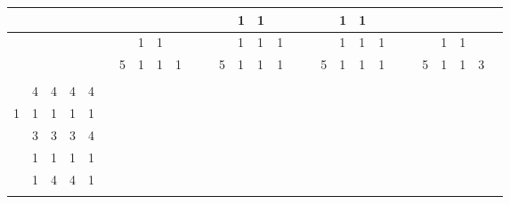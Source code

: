 \documentclass{article}
\begin{document}
\begin{center}

\begin{tabular}
{|p{5pt}|p{5pt}|p{5pt}|p{5pt}|p{5pt}||p{5pt}|p{5pt}|p{5pt}|p{5pt}|p{5pt}||p{5pt}|p{5pt}|p{5pt}|p{5pt}|p{5pt}||p{5pt}|p{5pt}|p{5pt}|p{5pt}|p{5pt}||p{5pt}|p{5pt}|p{5pt}|p{5pt}|p{5pt}||p{5pt}|p{5pt}|p{5pt}|p{5pt}|}
\hline
 & & & & & & & & & & & & &1&1& & & & &1&1& & & & & & & & \\
\hline
 & & & & & & &1&1& & & & &1&1&1& & & &1&1&1& & & &1&1& & \\
\hline
 & & & & & &5&1&1&1& & &5&1&1&1& & &5&1&1&1& & &5&1&1&3& \\
\hline
\hline
 & & & & & & & & & & & & & & & & & & & & & & & & & & & & \\
\hline
 &4&4&4&4& & & & & & & & & & & & & & & & & & & & & & & & \\
\hline
1&1&1&1&1& & & & & & & & & & & & & & & & & & & & & & & & \\
\hline
 &3&3&3&4& & & & & & & & & & & & & & & & & & & & & & & & \\
\hline
 &1&1&1&1& & & & & & & & & & & & & & & & & & & & & & & & \\
\hline
\hline
 &1&4&4&1& & & & & & & & & & & & & & & & & & & & & & & & \\
\hline
 & & & & & & & & & & & & & & & & & & & & & & & & & & & & \\
\hline

\end{tabular}

\end{center}
\end{document}
